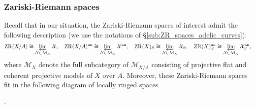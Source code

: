 \documentclass [11pt,reqno]{amsart}
\newcommand{\1}{\mathmybb{1}}
\def\cM{{\mathcal{M}}}
\def\cX{{\mathcal{X}}}
\def\an{\operatorname{an}}
\def\Spec{\operatorname{Spec}}
\def\ZR{\operatorname{ZR}}
\def\tilde{\widetilde}
\begin{document}
\subsubsection{Zariski-Riemann spaces}

Recall that in our situation, the Zariski-Riemann spaces of interest admit the following description (we use the notations of \S \ref{sub:ZR_spaces_adelic_curves}):
\begin{align*}
\ZR(X/A)\cong\displaystyle\varprojlim_{\cX\in\cM_{X}}\cX, \quad \ZR(X/A)^{\an}\cong\varprojlim_{\cX\in\cM_{X}}\cX^{\an}, \quad \ZR(X)_{S} \cong \varprojlim_{\cX\in\cM_{X}}\cX_{S}, \quad \ZR(X)_{S}^{\an} \cong \varprojlim_{\cX\in\cM_{X}}\cX_{S}^{\an},
\end{align*}
where $\cM_{X}$ denote the full subcategory of $\cM_{X/A}$ consisting of projective flat and coherent projective models of $X$ over $A$. Moreover, these Zariski-Riemann spaces fit in the following diagram of locally ringed spaces  
\begin{center}
.
\end{center}
\end{document}
